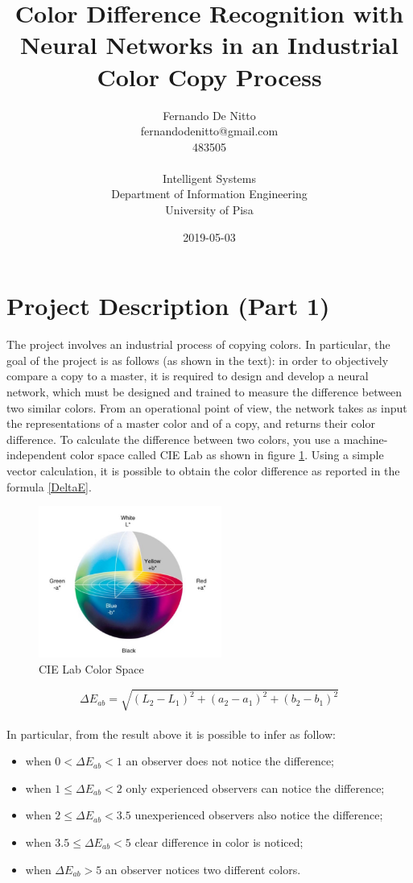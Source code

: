 \documentclass{article}
\title{Color Difference Recognition with Neural Networks in an Industrial Color Copy Process }
\date{2019-05-03}
\author{Fernando De Nitto\\fernandodenitto@gmail.com \\483505\\\\ Intelligent Systems\\ Department of Information Engineering\\ University of Pisa\\}
\begin{document}
\maketitle


\section{Project Description (Part 1) }
The project involves an industrial process of copying colors. In particular, the goal of the project is as follows (as shown in the text): in order to objectively compare a copy to a master, it is required to design and develop a neural network, which must be designed and trained to measure the difference between two similar colors. From an operational point of view, the network takes as input the representations of a master color and of a copy, and returns their color difference. To calculate the difference between two colors, you use a machine-independent color space called CIE Lab as shown in figure \ref{fig:cielab}. Using a simple vector calculation, it is possible to obtain the color difference as reported in the formula \ref{DeltaE}.

 \begin{figure}[!h]
 \center
  \includegraphics[width=170pt]{img/cielab.jpg}
  \caption{CIE Lab Color Space}
  \label{fig:cielab}
\end{figure}

\begin{equation}\label{DeltaE}
	\Delta E_{ab}= \sqrt{(L_{2}-L_{1})^2+(a_{2}-a_{1})^2+(b_{2}-b_{1})^2}
\end{equation}	
\\ In particular, from the result above it is possible to infer as follow:
\begin{itemize}
	\item when $0<\Delta E_{ab}<1$ an observer does not notice the difference;
	\item when $1\leq\Delta E_{ab}<2$ only experienced observers can notice the difference;
	\item when $2\leq\Delta E_{ab}<3.5$ unexperienced observers also notice the difference;
	\item when $3.5\leq\Delta E_{ab}<5$ clear difference in color is noticed;
	\item when $\Delta E_{ab}>5$ an observer notices two different colors.
\end{itemize}
\end{document}
